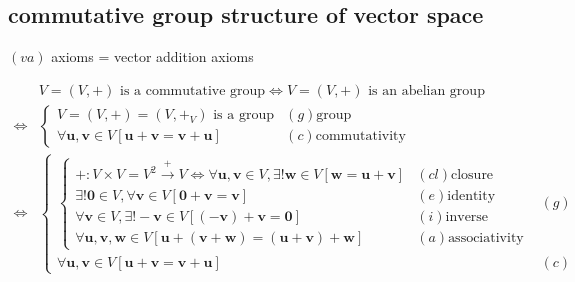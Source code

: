 \documentclass[
]{book}
\theoremstyle{definition}
\theoremstyle{definition}
\theoremstyle{definition}
\theoremstyle{definition}
\theoremstyle{remark}
\begin{document}
\hypertarget{commutative-group-structure-of-vector-space}{%
\subsection{commutative group structure of vector space}\label{commutative-group-structure-of-vector-space}}

\(\left(va\right)\) axioms = vector addition axioms

\[
\begin{aligned}
 & V=\left(V,+\right)\text{ is a commutative group}\Leftrightarrow V=\left(V,+\right)\text{ is an abelian group}\\
\Leftrightarrow & \begin{cases}
V=\left(V,+\right)=\left(V,+_{{\scriptscriptstyle V}}\right)\text{ is a group} & \left(g\right)\text{group}\\
\forall\boldsymbol{u},\boldsymbol{v}\in V\left[\boldsymbol{u}+\boldsymbol{v}=\boldsymbol{v}+\boldsymbol{u}\right] & \left(c\right)\text{commutativity}
\end{cases}\\
\Leftrightarrow & \begin{cases}
\begin{cases}
+:V\times V=V^{2}\overset{+}{\rightarrow}V\Leftrightarrow\forall\boldsymbol{u},\boldsymbol{v}\in V,\exists!\boldsymbol{w}\in V\left[\boldsymbol{w}=\boldsymbol{u}+\boldsymbol{v}\right] & \left(cl\right)\text{closure}\\
\exists!\boldsymbol{0}\in V,\forall\boldsymbol{v}\in V\left[\boldsymbol{0}+\boldsymbol{v}=\boldsymbol{v}\right] & \left(e\right)\text{identity}\\
\forall\boldsymbol{v}\in V,\exists!-\boldsymbol{v}\in V\left[\left(-\boldsymbol{v}\right)+\boldsymbol{v}=\boldsymbol{0}\right] & \left(i\right)\text{inverse}\\
\forall\boldsymbol{u},\boldsymbol{v},\boldsymbol{w}\in V\left[\boldsymbol{u}+\left(\boldsymbol{v}+\boldsymbol{w}\right)=\left(\boldsymbol{u}+\boldsymbol{v}\right)+\boldsymbol{w}\right] & \left(a\right)\text{associativity}
\end{cases} & \left(g\right)\\
\forall\boldsymbol{u},\boldsymbol{v}\in V\left[\boldsymbol{u}+\boldsymbol{v}=\boldsymbol{v}+\boldsymbol{u}\right] & \left(c\right)
\end{cases}
\end{aligned}
\]
\end{document}
